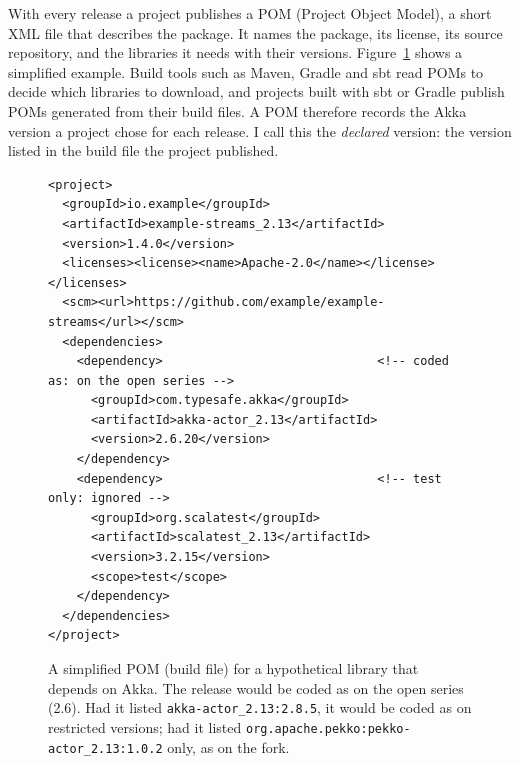 \documentclass[11pt]{article}
\begin{document}
With every release a project publishes a POM (Project Object Model), a short XML file that describes the package. It names the package, its license, its source repository, and the libraries it needs with their versions. Figure~\ref{fig:pom} shows a simplified example. Build tools such as Maven, Gradle and sbt read POMs to decide which libraries to download, and projects built with sbt or Gradle publish POMs generated from their build files. A POM therefore records the Akka version a project chose for each release. I call this the \emph{declared} version: the version listed in the build file the project published.

\begin{figure}[t]
\centering
\begin{minipage}{0.86\textwidth}
\footnotesize
\begin{verbatim}
<project>
  <groupId>io.example</groupId>
  <artifactId>example-streams_2.13</artifactId>
  <version>1.4.0</version>
  <licenses><license><name>Apache-2.0</name></license></licenses>
  <scm><url>https://github.com/example/example-streams</url></scm>
  <dependencies>
    <dependency>                              <!-- coded as: on the open series -->
      <groupId>com.typesafe.akka</groupId>
      <artifactId>akka-actor_2.13</artifactId>
      <version>2.6.20</version>
    </dependency>
    <dependency>                              <!-- test only: ignored -->
      <groupId>org.scalatest</groupId>
      <artifactId>scalatest_2.13</artifactId>
      <version>3.2.15</version>
      <scope>test</scope>
    </dependency>
  </dependencies>
</project>
\end{verbatim}
\end{minipage}
\caption{A simplified POM (build file) for a hypothetical library that depends on Akka. The release would be coded as on the open series (2.6). Had it listed \texttt{akka-actor\_2.13:2.8.5}, it would be coded as on restricted versions; had it listed \texttt{org.apache.pekko:pekko-actor\_2.13:1.0.2} only, as on the fork.}
\label{fig:pom}
\end{figure}
\end{document}
